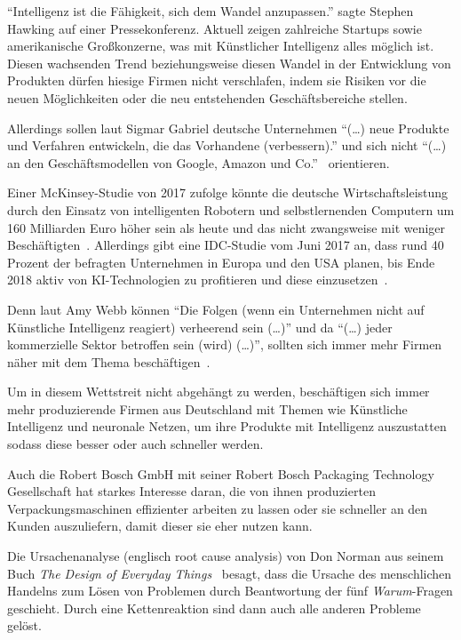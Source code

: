 \enquote{Intelligenz ist die Fähigkeit, sich dem Wandel anzupassen.} sagte Stephen Hawking auf einer Pressekonferenz.
Aktuell zeigen zahlreiche Startups sowie amerikanische Großkonzerne, was mit Künstlicher Intelligenz alles möglich ist.
Diesen wachsenden Trend beziehungsweise diesen Wandel in der Entwicklung von Produkten dürfen hiesige Firmen nicht
verschlafen, indem sie Risiken vor die neuen Möglichkeiten oder die neu entstehenden Geschäftsbereiche stellen.

Allerdings sollen laut Sigmar Gabriel deutsche Unternehmen \enquote{(\ldots) neue Produkte und Verfahren
entwickeln, die das Vorhandene (verbessern).} und sich nicht \enquote{(\ldots) an den Geschäftsmodellen von Google,
Amazon und Co.}~\cite{article_einleitung_ww_sg} orientieren.

Einer McKinsey-Studie von 2017 zufolge könnte die deutsche Wirtschaftsleistung durch den Einsatz von intelligenten
Robotern und selbstlernenden Computern um 160 Milliarden Euro höher sein als heute und das nicht zwangsweise mit weniger
Beschäftigten~\cite{online_einleitung_mckinsey}. Allerdings gibt eine IDC-Studie vom Juni 2017 an, dass rund 40 Prozent
der befragten Unternehmen in Europa und den USA planen, bis Ende 2018 aktiv von KI-Technologien zu profitieren und diese
einzusetzen~\cite{article_grundlagen_salesforce}.

Denn laut Amy Webb können \enquote{Die Folgen (wenn ein Unternehmen nicht auf Künstliche Intelligenz reagiert)
verheerend sein (\ldots)} und da \enquote{(\ldots) jeder kommerzielle Sektor betroffen sein (wird) (\ldots)}, sollten
sich immer mehr Firmen näher mit dem Thema beschäftigen~\cite{article_einleitung_dub_aw}.

Um in diesem Wettstreit nicht abgehängt zu werden, beschäftigen sich immer mehr produzierende Firmen aus Deutschland mit
Themen wie Künstliche Intelligenz und neuronale Netzen, um ihre Produkte mit Intelligenz auszustatten sodass diese
besser oder auch schneller werden.

Auch die Robert Bosch GmbH mit seiner Robert Bosch Packaging Technology Gesellschaft hat starkes Interesse daran, die
von ihnen produzierten Verpackungsmaschinen effizienter arbeiten zu lassen oder sie schneller an den Kunden
auszuliefern, damit dieser sie eher nutzen kann.

Die Ursachenanalyse (englisch root cause analysis) von Don Norman aus seinem Buch \textit{The Design of Everyday
Things}~\cite{book_einleitung_donnorman} besagt, dass die Ursache des menschlichen Handelns zum Lösen von Problemen
durch Beantwortung der fünf \textit{Warum}-Fragen geschieht. Durch eine Kettenreaktion sind dann auch alle anderen
Probleme gelöst.


